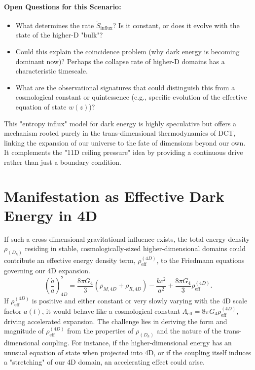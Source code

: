 \documentclass[a4paper, 12pt, oneside]{book}
\numberwithin{equation}{chapter}
\begin{document}
\paragraph{Open Questions for this Scenario:}
\begin{itemize}
    \item What determines the rate $\dot{S}_{\text{influx}}$? Is it constant, or does it evolve with the state of the higher-D "bulk"?
    \item Could this explain the coincidence problem (why dark energy is becoming dominant now)? Perhaps the collapse rate of higher-D domains has a characteristic timescale.
    \item What are the observational signatures that could distinguish this from a cosmological constant or quintessence (e.g., specific evolution of the effective equation of state \(w(z)\))?
\end{itemize}
This "entropy influx" model for dark energy is highly speculative but offers a mechanism rooted purely in the trans-dimensional thermodynamics of DCT, linking the expansion of our universe to the fate of dimensions beyond our own. It complements the "11D ceiling pressure" idea by providing a continuous drive rather than just a boundary condition.

\section{Manifestation as Effective Dark Energy in 4D}
\label{sec:EffectiveDE}
If such a cross-dimensional gravitational influence exists, the total energy density $\rho_{(D_h)}$ residing in stable, cosmologically-sized higher-dimensional domains could contribute an effective energy density term, $\rho_{\text{eff}}^{(4D)}$, to the Friedmann equations governing our 4D expansion.
\[
    \left(\frac{\dot{a}}{a}\right)^2_{4D} = \frac{8\pi G_4}{3}\left(\rho_{M,4D} + \rho_{R,4D}\right) - \frac{k c^2}{a^2} + \frac{8\pi G_4}{3} \rho_{\text{eff}}^{(4D)}.
\]
If $\rho_{\text{eff}}^{(4D)}$ is positive and either constant or very slowly varying with the 4D scale factor $a(t)$, it would behave like a cosmological constant $\Lambda_{\text{eff}} = 8\pi G_4 \rho_{\text{eff}}^{(4D)}$, driving accelerated expansion. The challenge lies in deriving the form and magnitude of $\rho_{\text{eff}}^{(4D)}$ from the properties of $\rho_{(D_h)}$ and the nature of the trans-dimensional coupling. For instance, if the higher-dimensional energy has an unusual equation of state when projected into 4D, or if the coupling itself induces a "stretching" of our 4D domain, an accelerating effect could arise.
\end{document}
